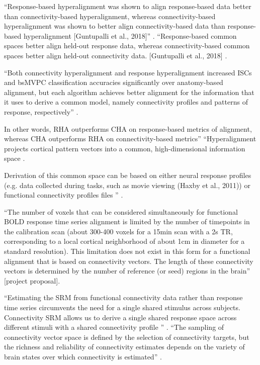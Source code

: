 ``Response-based hyperalignment was shown to align response-based data better
than connectivity-based hyperalignment, whereas connectivity-based
hyperalignment was shown to better align connectivity-based data than
response-based hyperalignment [Guntupalli et al., 2018]''
\citep{busch2021hybrid}.
%
``Response-based common spaces better align held-out response data, whereas
connectivity-based common spaces better align held-out connectivity data.
[Guntupalli et al., 2018] \citep{busch2021hybrid}.

%
``Both connectivity hyperalignment and response hyperalignment increased ISCs
and bsMVPC classification accuracies significantly over anatomy-based alignment,
but each algorithm achieves better alignment for the information that it uses to
derive a common model, namely connectivity profiles and patterns of response,
respectively'' \citep{guntupalli2018computational}.


%
In other words, RHA outperforms CHA on response-based metrics of alignment,
whereas CHA outperforms RHA on connectivity-based metrics'' ``Hyperalignment
projects cortical pattern vectors into a common, high-dimensional information
space \citep{haxby2020hyperalignment}.

%
Derivation of this common space can be based on either neural response profiles
(e.g. data collected during tasks, such as movie viewing (Haxby et al., 2011))
or functional connectivity profiles files \citep{guntupalli2018computational}''
\citep{busch2021hybrid}.

%
``The number of voxels that can be considered simultaneously for functional BOLD
response time series alignment is limited by the number of timepoints in the
calibration scan (about 300-400 voxels for a 15min scan with a 2s TR,
corresponding to a local cortical neighborhood of about 1cm in diameter for a
standard resolution).
%
This limitation does not exist in this form for a functional alignment that is
based on connectivity vectors.
%
The length of these connectivity vectors is determined by the number of
reference (or seed) regions in the brain'' [project proposal].

``Estimating the SRM from functional connectivity data rather than response time
series circumvents the need for a single shared stimulus across subjects.
%
Connectivity SRM allows us to derive a single shared response space across
different stimuli with a shared connectivity profile
\citep{nastase2019leveraging}'' \citep{kumar2020brainiak}.
%
``The sampling of connectivity vector space is defined by the selection of
connectivity targets, but the richness and reliability of connectivity estimates
depends on the variety of brain states over which connectivity is estimated''
\citep{haxby2020hyperalignment}.




